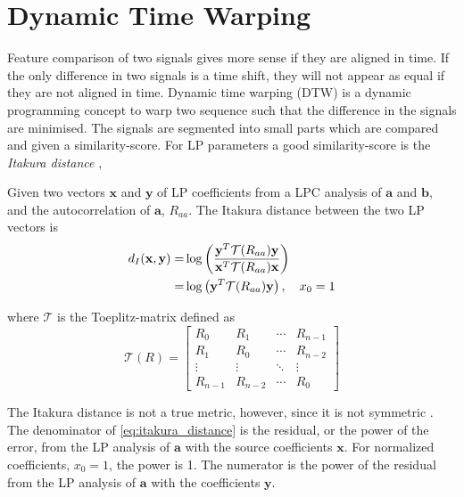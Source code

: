 \section{Dynamic Time Warping} %
\label{sec:dynamic_time_warping}
\newcommand{\ttt}{\mathcal T}
\newcommand{\auto}{R}
\newcommand{\Auto}{\boldsymbol R}

Feature comparison of two signals gives more sense if they are aligned in time. If the only difference in two signals is a time shift, they will not appear as equal if they are not aligned in time. Dynamic time warping (DTW) is a dynamic programming concept to warp two sequence such that the difference in the signals are minimised. The signals are segmented into small parts which are compared and given a similarity-score. For LP parameters a good similarity-score is the \emph{Itakura distance} \cite{itakura75min},
\newcommand{\ita}{d_{I}}
\begin{definition}
	Given two vectors $\mathbf{x}$ and $\mathbf{y}$ of LP coefficients from a LPC analysis of $\mathbf{a}$ and $\mathbf{b}$, and the autocorrelation of $\mathbf{a}$, $\auto_{aa}$. The Itakura distance between the two LP vectors is
	\begin{equation}
		\label{eq:itakura_distance}
		\begin{split}
			\ita(\mathbf{x},\mathbf{y}) = & \log\pbrackets{\frac{\mathbf{y}^T \ttt(\auto_{aa}) \mathbf{y}}{\mathbf{x}^T \ttt(\auto_{aa}) \mathbf{x}}} \\
			 = & \log\pbrackets{\mathbf{y}^T \ttt(\auto_{aa}) \mathbf{y}}, \quad x_0 = 1
		\end{split}
	\end{equation}
\end{definition}
where $\ttt$ is the Toeplitz-matrix defined as 
\begin{equation}
	\label{eq:toeplitz}
	\ttt(\auto) = 
	\begin{bmatrix}
		\auto_0 & \auto_1 & \dotsi & \auto_{n-1} 	\\
		\auto_1 & \auto_0 & \dotsi & \auto_{n-2} \\
		\vdots & \vdots & \ddots & \vdots \\
		\auto_{n-1} & \auto_{n-2} & \dotsi & \auto_{0}
	\end{bmatrix}
\end{equation}	

The Itakura distance is not a true metric, however, since it is not symmetric \cite{kreyszig89}. The denominator of \eqref{eq:itakura_distance} is the residual, or the power of the error, from the LP analysis of $\mathbf{a}$ with the source coefficients $\mathbf{x}$. For normalized coefficients, $x_0 = 1$, the power is 1. The numerator is the power of the residual from the LP analysis of $\mathbf{a}$ with the coefficients $\mathbf{y}$. 

